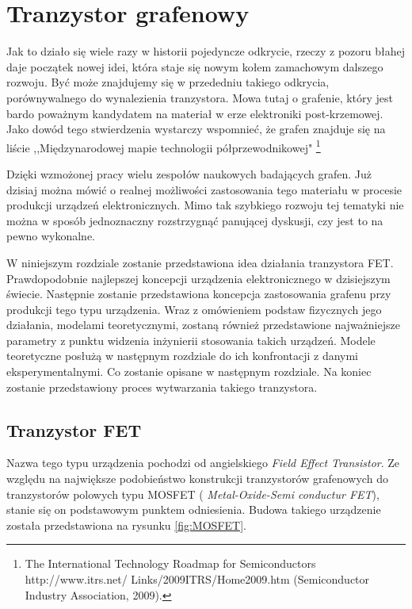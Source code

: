 \chapter{Tranzystor grafenowy}

Jak to działo się wiele razy w historii pojedyncze odkrycie, rzeczy z pozoru błahej daje początek
nowej idei, która staje się nowym kołem zamachowym dalszego rozwoju. Być może znajdujemy się 
w przededniu takiego odkrycia, porównywalnego do wynalezienia tranzystora. Mowa tutaj o grafenie, 
który jest bardo poważnym kandydatem na materiał w erze elektroniki post-krzemowej. 
Jako dowód tego stwierdzenia wystarczy wspomnieć, że grafen znajduje się na liście 
,,Międzynarodowej mapie technologii półprzewodnikowej" \footnote{The International Technology Roadmap for Semiconductors http://www.itrs.net/
Links/2009ITRS/Home2009.htm (Semiconductor Industry Association, 2009).}

Dzięki wzmożonej pracy wielu zespołów naukowych badających grafen. Już dzisiaj można mówić o realnej 
możliwości zastosowania tego materiału w procesie produkcji urządzeń elektronicznych. Mimo tak szybkiego 
rozwoju tej tematyki nie można w sposób jednoznaczny rozstrzygnąć panującej dyskusji, czy jest to na 
pewno wykonalne. 

W niniejszym rozdziale zostanie przedstawiona idea działania tranzystora FET. Prawdopodobnie najlepszej 
koncepcji urządzenia elektronicznego w dzisiejszym świecie. Następnie zostanie przedstawiona koncepcja 
zastosowania grafenu przy produkcji tego typu urządzenia. Wraz z omówieniem podstaw fizycznych jego działania,
modelami teoretycznymi, zostaną również przedstawione najważniejsze parametry z punktu widzenia inżynierii
stosowania takich urządzeń. Modele teoretyczne posłużą w następnym rozdziale do ich konfrontacji z danymi
eksperymentalnymi. Co zostanie opisane w następnym rozdziale. Na koniec zostanie przedstawiony proces 
wytwarzania takiego tranzystora.



	\section{Tranzystor FET}
Nazwa tego typu urządzenia pochodzi od angielskiego \textit{Field Effect Transistor}. Ze względu na największe
podobieństwo konstrukcji tranzystorów grafenowych do tranzystorów polowych typu MOSFET (\textit{ Metal-Oxide-Semi
conductur FET}), stanie się on podstawowym punktem odniesienia.
Budowa takiego urządzenie została przedstawiona na rysunku \ref{fig:MOSFET}. 


